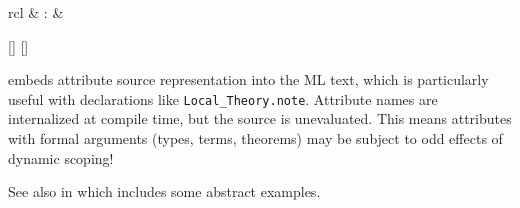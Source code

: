 \begin{isabellebody}
\begin{isamarkuptext}
\begin{description}
  \end{description}%
\end{isamarkuptext}%
\isamarkuptrue%
%
\endisatagmlref
{\isafoldmlref}%
%
\isadelimmlref
%
\endisadelimmlref
%
\isadelimmlantiq
%
\endisadelimmlantiq
%
\isatagmlantiq
%
\begin{isamarkuptext}%
\begin{matharray}{rcl}
  \hypertarget{ML antiquotation.attributes}{\hyperlink{ML antiquotation.attributes}{\mbox{}}} & : &  \\
  \end{matharray}

  \begin{railoutput}
[]
[]
\rail@end
\end{railoutput}


  \begin{description}

  \item {} embeds attribute source
  representation into the ML text, which is particularly useful with
  declarations like \verb|Local_Theory.note|.  Attribute names are
  internalized at compile time, but the source is unevaluated.  This
  means attributes with formal arguments (types, terms, theorems) may
  be subject to odd effects of dynamic scoping!

  \end{description}%
\end{isamarkuptext}%
\isamarkuptrue%
%
\endisatagmlantiq
{\isafoldmlantiq}%
%
\isadelimmlantiq
%
\endisadelimmlantiq
%
\isadelimmlex
%
\endisadelimmlex
%
\isatagmlex
%
\begin{isamarkuptext}%
See also \hyperlink{command.attribute-setup}{\mbox{}} in
  \cite{isabelle-isar-ref} which includes some abstract examples.%
\end{isamarkuptext}%
\isamarkuptrue%
%
\endisatagmlex
{\isafoldmlex}%
%
\isadelimmlex
%
\endisadelimmlex
%
\isadelimtheory
%
\endisadelimtheory
%
\isatagtheory
{}\isamarkupfalse%
%
\endisatagtheory
{\isafoldtheory}%
%
\isadelimtheory
%
\endisadelimtheory
\isanewline
\end{isabellebody}%
